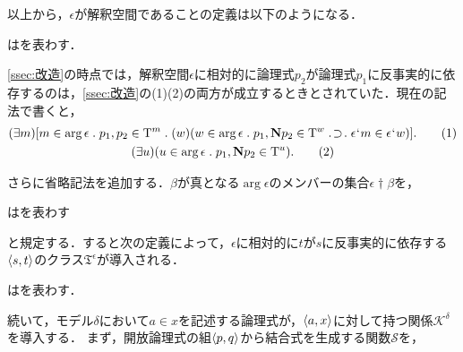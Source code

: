 以上から，$\epsilon$が解釈空間であることの定義は以下のようになる．
\begin{df}
\label{df:解釈空間}
はを表わす．
\end{df}

\ref{ssec:改造}の時点では，解釈空間$\epsilon$に相対的に論理式$p_2$が論理式$p_1$に反事実的に依存するのは，\ref{ssec:改造}の(1)(2)の両方が成立するときとされていた．現在の記法で書くと，
\begin{gather}
    (\exists m)[
        m\in\arg\epsilon\con{1}p_1,p_2\in \mathrm{T}^m\con{1}
        (w)(w\in\arg \epsilon\con{1}p_1,\mathbf{N}p_2\in \mathrm{T}^w\case{1}{1}{1}\epsilon\fap m\in\epsilon\fap w)
    ].\tag{1}\\
    (\exists u)(u\in\arg\epsilon\con{1}p_1,\mathbf{N}p_2\in \mathrm{T}^u).\tag{2}
\end{gather}

\noindent さらに省略記法を追加する．$\beta$が真となる$\arg\epsilon$のメンバーの集合$ \epsilon\dagger\beta $を，
\begin{df}
\label{df:真理化する到達可能モデルの集合}
\kagi{$
    \epsilon\dagger\beta
$}はを表わす
\end{df}
\noindent と規定する．すると次の定義によって，$\epsilon$に相対的に$t$が$s$に反事実的に依存する$\langle s,t \rangle$のクラス$\mathfrak{T}^\epsilon$が導入される．

\begin{df}
\label{df:反事実的依存関係}
はを表わす．
\end{df}

続いて，モデル$\delta$において$ a\in x $を記述する論理式が，$ \langle a,x \rangle $に対して持つ関係$ \mathcal{K}^\delta $を導入する．
まず，開放論理式の組$ \langle p,q \rangle $から結合式を生成する関数$ \mathcal{S} $を，

